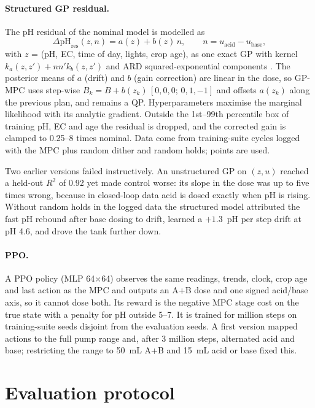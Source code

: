\documentclass[11pt]{article}
\begin{document}
\paragraph{Structured GP residual.} The pH residual of the nominal model is modelled as
\begin{equation}
\Delta\text{pH}_\text{res}(z, n) = a(z) + b(z)\,n,\qquad n = u_\text{acid} - u_\text{base},
\end{equation}
with $z$ = (pH, EC, time of day, lights, crop age), as one exact GP with kernel $k_a(z,z') + n n' k_b(z,z')$ and ARD squared-exponential components \citep{rasmussen2006gpml}. The posterior means of $a$ (drift) and $b$ (gain correction) are linear in the dose, so GP-MPC uses step-wise $B_k = B + b(z_k)\,[0,0,0;\,0,1,-1]$ and offsets $a(z_k)$ along the previous plan, and remains a QP. Hyperparameters maximise the marginal likelihood with its analytic gradient. Outside the 1st--99th percentile box of training pH, EC and age the residual is dropped, and the corrected gain is clamped to 0.25--8 times nominal. Data come from \nGpEpisodes{} training-suite cycles logged with the MPC plus random dither and random holds; \nGpPoints{} points are used.

Two earlier versions failed instructively. An unstructured GP on $(z, u)$ reached a held-out $R^2$ of 0.92 yet made control worse: its slope in the dose was up to five times wrong, because in closed-loop data acid is dosed exactly when pH is rising. Without random holds in the logged data the structured model attributed the fast pH rebound after base dosing to drift, learned a $+1.3$~pH per step drift at pH 4.6, and drove the tank further down.

\paragraph{PPO.} A PPO policy \citep{schulman2017ppo,raffin2021sb3} (MLP 64$\times$64) observes the same readings, trends, clock, crop age and last action as the MPC and outputs an A+B dose and one signed acid/base axis, so it cannot dose both. Its reward is the negative MPC stage cost on the true state with a penalty for pH outside 5--7. It is trained for \nPpoSteps{} million steps on training-suite seeds disjoint from the evaluation seeds. A first version mapped actions to the full pump range and, after 3 million steps, alternated acid and base; restricting the range to \SI{50}{mL} A+B and \SI{15}{mL} acid or base fixed this.

\section{Evaluation protocol}\label{sec:protocol}
\end{document}
